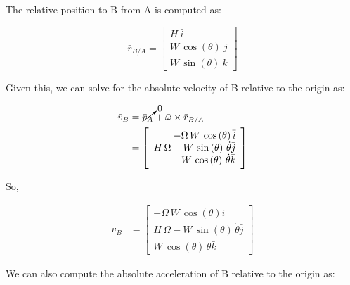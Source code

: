 \documentclass[12pt, letterpaper]{../assignment}
\begin{document}
The relative position to B from A is computed as:

$$ \bar{r}_{B/A} = \left[\begin{array}{r} H \ \bar{i}\\
    W\,\cos\left(\theta\right) \ \bar{j}\\
    W\,\sin\left(\theta\right) \ \bar{k}
\end{array}\right] $$

Given this, we can solve for the absolute velocity of B relative to the origin as:

\begin{equation*}
    \begin{aligned}
    \bar{v}_B &= \cancelto{0}{\bar{v}_A} + \bar{\omega} \times \bar{r}_{B/A} \\
                 &= \left[\begin{array}{r} -\Omega \,W\,\cos\left(\theta\right) \bar{i}\\
                    H\,\Omega -W\,\sin\left(\theta\right)\,\dot{\theta} \bar{j}\\
                    W\,\cos\left(\theta\right)\,\dot{\theta} \bar{k}
                \end{array}\right]
    \end{aligned}
\end{equation*}

So,

\begin{answer}
    \begin{equation*}
        \begin{aligned}
        \bar{v}_B &= \left[\begin{array}{r} -\Omega \,W\,\cos\left(\theta\right) \bar{i}\\
            H\,\Omega -W\,\sin\left(\theta\right)\,\dot{\theta} \bar{j}\\
            W\,\cos\left(\theta\right)\,\dot{\theta} \bar{k}
        \end{array}\right]
        \end{aligned}
    \end{equation*}
\end{answer}

We can also compute the absolute acceleration of B relative to the origin as:
\end{document}
